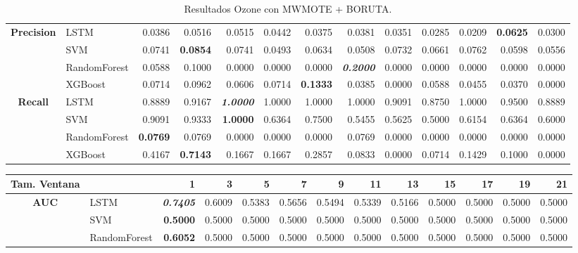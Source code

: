 \begin{table}[H]
\begin{adjustbox}{max width=12cm}
\begin{tabular}{|c|l|r|r|r|r|r|r|r|r|r|r|r|}
			\hline
			\textbf{Precision} &  LSTM &  0.0386 &  0.0516 &  0.0515 &  0.0442 &  0.0375 &  0.0381 &  0.0351 &  0.0285 &  0.0209 & \textbf{  0.0625 } &  0.0300 \\
			&  SVM &  0.0741 & \textbf{  0.0854 } &  0.0741 &  0.0493 &  0.0634 &  0.0508 &  0.0732 &  0.0661 &  0.0762 &  0.0598 &  0.0556 \\
			&  RandomForest &  0.0588 &  0.1000 &  0.0000 &  0.0000 &  0.0000 & \textit{ \textbf{  0.2000 } } &  0.0000 &  0.0000 &  0.0000 &  0.0000 &  0.0000 \\
			&  XGBoost &  0.0714 &  0.0962 &  0.0606 &  0.0714 & \textbf{  0.1333 } &  0.0385 &  0.0000 &  0.0588 &  0.0455 &  0.0370 &  0.0000 \\
			\hline
			\textbf{Recall} &  LSTM &  0.8889 &  0.9167 & \textit{ \textbf{  1.0000 } } &  1.0000 &  1.0000 &  1.0000 &  0.9091 &  0.8750 &  1.0000 &  0.9500 &  0.8889 \\
			&  SVM &  0.9091 &  0.9333 & \textbf{  1.0000 } &  0.6364 &  0.7500 &  0.5455 &  0.5625 &  0.5000 &  0.6154 &  0.6364 &  0.6000 \\
			&  RandomForest & \textbf{  0.0769 } &  0.0769 &  0.0000 &  0.0000 &  0.0000 &  0.0769 &  0.0000 &  0.0000 &  0.0000 &  0.0000 &  0.0000 \\
			&  XGBoost &  0.4167 & \textbf{  0.7143 } &  0.1667 &  0.1667 &  0.2857 &  0.0833 &  0.0000 &  0.0714 &  0.1429 &  0.1000 &  0.0000 \\
			\hline
		\end{tabular}
	\end{adjustbox}
	\caption{Resultados Ozone con MWMOTE + BORUTA.}
	\label{tab:Ozone_MWMOTE_BORUTA}
\end{table}\begin{table}[H]
\centering
\begin{adjustbox}{max width=12cm}
	\begin{tabular}{|c|l|r|r|r|r|r|r|r|r|r|r|r|}
		\hline
		\textbf{Tam. Ventana} &         &      1  &      3  &      5  &      7  &      9  &      11 &      13 &      15 &      17 &      19 &      21 \\
		\hline
		\textbf{AUC} &  LSTM & \textit{ \textbf{  0.7405 } } &  0.6009 &  0.5383 &  0.5656 &  0.5494 &  0.5339 &  0.5166 &  0.5000 &  0.5000 &  0.5000 &  0.5000 \\
		&  SVM & \textbf{  0.5000 } &  0.5000 &  0.5000 &  0.5000 &  0.5000 &  0.5000 &  0.5000 &  0.5000 &  0.5000 &  0.5000 &  0.5000 \\
		&  RandomForest & \textbf{  0.6052 } &  0.5000 &  0.5000 &  0.5000 &  0.5000 &  0.5000 &  0.5000 &  0.5000 &  0.5000 &  0.5000 &  0.5000 \\

\end{tabular}
\end{adjustbox}
\end{table}
